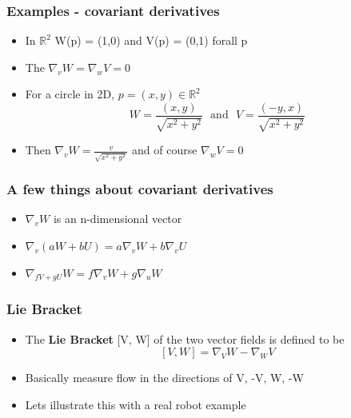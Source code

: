 \documentclass[10pt]{beamer}
\newcommand{\myemph}[1]{{\usebeamercolor[fg]{emphprimary}
    \textbf{#1}}}
\begin{document}
\begin{frame}
  \frametitle{Examples - covariant derivatives}
  \begin{itemize}
  \item In $\mathbb{R}^2$ W(p) = (1,0) and V(p) = (0,1) forall p
  \item The $\nabla_v W = \nabla_w V = 0$ 
  \item For a circle in 2D, $p = (x, y) \in \mathbb{R}^2$
    \[
      W = \frac{(x,y)}{\sqrt{x^2 + y^2}} \mbox{~ and ~}
      V = \frac{(-y, x)}{\sqrt{x^2+y^2}}
    \]
  \item Then $\nabla_v W = \frac{v}{\sqrt{x^2 + y^2}}$ and of course
    $\nabla_w V = 0$
  \end{itemize}
\end{frame}

\begin{frame}
  \frametitle{A few things about covariant derivatives}
  \begin{itemize}
  \item $\nabla_v W$ is an n-dimensional vector 
  \item $\nabla_v (a W + b U) = a \nabla_v W + b \nabla_v U$
  \item $\nabla_{fV+gU} W = f \nabla_v W + g \nabla_u W$
  \end{itemize}
\end{frame}

\begin{frame}
  \frametitle{Lie Bracket}
  \begin{itemize}
  \item The \myemph{Lie Bracket} [V, W] of the two vector fields is
    defined to be
    \[ [V, W] = \nabla_V W - \nabla_W V \]
  \item Basically measure flow in the directions of V, -V, W, -W
  \item Lets illustrate this with a real robot example 
  \end{itemize}
\end{frame}
\end{document}
